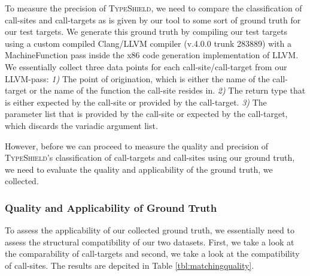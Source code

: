 To measure the precision of \textsc{TypeShield}, we need to compare the classification of call-sites and call-targets as is given by our tool to
some sort of ground truth for our test targets. We generate this ground truth by compiling our test targets using a custom compiled Clang/LLVM
compiler (v.4.0.0 trunk 283889) with a MachineFunction pass inside the x86 code generation implementation of LLVM. We essentially 
collect three data points for each call-site/call-target from our LLVM-pass:
\textit{1)} The point of origination, which is either the name of the call-target or the name of the function the call-site resides in.
\textit{2)} The return type that is either expected by the call-site or provided by the call-target.
\textit{3)} The parameter list that is provided by the call-site or expected by the call-target, which discards the variadic argument list.

However, before we can proceed to measure the quality and precision of \textsc{TypeShield}'s classification of call-targets and call-sites
using our ground truth, we need to evaluate the quality and applicability of the ground truth, we collected.

\subsubsection{Quality and Applicability of Ground Truth}
\label{subsection:typeshieldprecision}
To assess the applicability of our collected ground truth, we essentially need to assess the structural compatibility of our two datasets.
First, we take a look at the comparability of call-targets and second, we take a look at the compatibility of call-sites. The results are depcited in Table \ref{tbl:matchingquality}.

